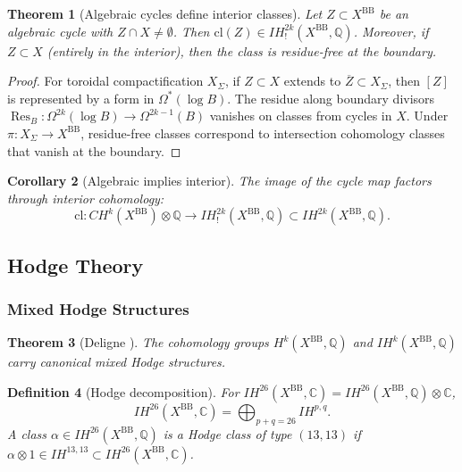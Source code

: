 \documentclass[12pt]{amsart}
\newtheorem{theorem}{Theorem}[section]
\newtheorem{corollary}[theorem]{Corollary}
\newtheorem{definition}[theorem]{Definition}
\theoremstyle{definition}
\DeclareMathOperator\Res{Res}
\newcommand{\Q}{\mathbb{Q}}
\newcommand{\C}{\mathbb{C}}
\newcommand{\tensor}{\otimes}
\newcommand{\IH}{\mathit{IH}}
\newcommand{\CH}{\mathit{CH}}
\newcommand{\cl}{\mathrm{cl}}
\begin{document}
\begin{theorem}[Algebraic cycles define interior classes]
Let $Z \subset X^{\mathrm{BB}}$ be an algebraic cycle with $Z \cap X \neq \emptyset$. Then $\cl(Z) \in \IH^{2k}_!(X^{\mathrm{BB}}, \Q)$. Moreover, if $Z \subset X$ (entirely in the interior), then the class is residue-free at the boundary.
\end{theorem}
\begin{proof}
For toroidal compactification $X_{\Sigma}$, if $Z \subset X$ extends to $\overline{Z} \subset X_{\Sigma}$, then $[Z]$ is represented by a form in $\Omega^*(\log B)$. The residue along boundary divisors $\Res_B \colon \Omega^{2k}(\log B) \to \Omega^{2k-1}(B)$ vanishes on classes from cycles in $X$. Under $\pi \colon X_{\Sigma} \to X^{\mathrm{BB}}$, residue-free classes correspond to intersection cohomology classes that vanish at the boundary.
\end{proof}

\begin{corollary}[Algebraic implies interior]\label{cor:interior_constraint}
The image of the cycle map factors through interior cohomology:
\[
\cl \colon \CH^k(X^{\mathrm{BB}}) \tensor \Q \to \IH^{2k}_!(X^{\mathrm{BB}}, \Q) \subset \IH^{2k}(X^{\mathrm{BB}}, \Q).
\]
\end{corollary}

\subsection{Hodge Theory}

\subsubsection{Mixed Hodge Structures}

\begin{theorem}[Deligne \cite{Deligne-Hodge2}]
The cohomology groups $H^k(X^{\mathrm{BB}}, \Q)$ and $\IH^k(X^{\mathrm{BB}}, \Q)$ carry canonical mixed Hodge structures.
\end{theorem}

\begin{definition}[Hodge decomposition]
For $\IH^{26}(X^{\mathrm{BB}}, \C) = \IH^{26}(X^{\mathrm{BB}}, \Q) \tensor \C$,
\[
\IH^{26}(X^{\mathrm{BB}}, \C) = \bigoplus_{p+q=26} \IH^{p,q}.
\]
A class $\alpha \in \IH^{26}(X^{\mathrm{BB}}, \Q)$ is a \emph{Hodge class of type $(13, 13)$} if $\alpha \tensor 1 \in \IH^{13,13} \subset \IH^{26}(X^{\mathrm{BB}}, \C)$.
\end{definition}
\end{document}
